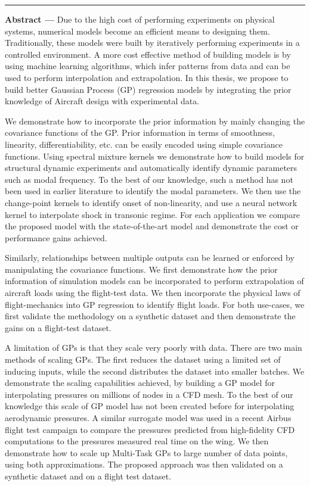 \noindent\rule[2pt]{\textwidth}{0.5pt}
{\large\textbf{Abstract ---}}
Due to the high cost of performing experiments on physical systems, numerical models become an efficient means to designing them. Traditionally, these models were built by iteratively performing experiments in a controlled environment. A more cost effective method of building models is by using machine learning algorithms, which infer patterns from data and can be used to perform interpolation and extrapolation. In this thesis, we propose to build better Gaussian Process (GP) regression models by integrating the prior knowledge of Aircraft design with experimental data. 

We demonstrate how to incorporate the prior information by mainly changing the covariance functions of the GP. Prior information in terms of smoothness, linearity, differentiability, etc. can be easily encoded using simple covariance functions. Using spectral mixture kernels we demonstrate how to build models for structural dynamic experiments and automatically identify dynamic parameters such as modal frequency. To the best of our knowledge, such a method has not been used in earlier literature to identify the modal parameters. We then use the change-point kernels to identify onset of non-linearity, and use a neural network kernel to interpolate shock in transonic regime. For each application we compare the proposed model with the state-of-the-art model and demonstrate the cost or performance gains achieved. 

Similarly, relationships between multiple outputs can be learned or enforced by manipulating the covariance functions. We first demonstrate how the prior information of simulation models can be incorporated to perform extrapolation of aircraft loads using the flight-test data. We then incorporate the physical laws of flight-mechanics into GP regression to identify flight loads. For both use-cases, we first validate the methodology on a synthetic dataset and then demonstrate the gains on a flight-test dataset.

A limitation of GPs is that they scale very poorly with data. There are two main methods of scaling GPs. The first reduces the dataset using a limited set of inducing inputs, while the second distributes the dataset into smaller batches. We demonstrate the scaling capabilities achieved, by building a GP model for interpolating pressures on millions of nodes in a CFD mesh. To the best of our knowledge this scale of GP model has not been created before for interpolating aerodynamic pressures. A similar surrogate model was used in a recent Airbus flight test campaign to compare the pressures predicted from high-fidelity CFD computations to the pressures measured real time on the wing. We then demonstrate how to scale up Multi-Task GPs to large number of data points, using both approximations. The proposed approach was then validated on a synthetic dataset and on a flight test dataset.

